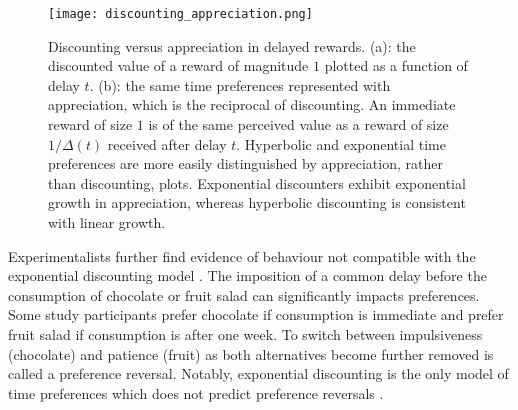\documentclass[titlepage, hidelinks, 12pt]{article}
\theoremstyle{plain}
\theoremstyle{remark}
\theoremstyle{definition}
\begin{document}
\begin{figure}[H]
    \centering
    \texttt{[image: discounting\_appreciation.png]}
    \caption[Example discounting and corresponding appreciation schedules.]{Discounting versus appreciation in delayed rewards. 
        (a): the discounted value of a reward of magnitude $1$ plotted as a function of delay $t$.  
        (b): the same time preferences represented with appreciation, which is the reciprocal of discounting. An immediate reward of size $1$ is
        of the same perceived value as a reward of size $1/\Delta(t)$ received after delay $t$. 
        Hyperbolic and exponential time preferences are more easily distinguished by appreciation, rather than discounting, plots.
        Exponential discounters exhibit exponential
        growth in appreciation, whereas hyperbolic discounting is consistent with linear growth.}
        \label{fig:discounting_appreciation}
\end{figure}



Experimentalists further find evidence of behaviour not compatible with the exponential discounting model \cite{read98}. 
The imposition of a common delay before the consumption of chocolate or fruit salad can significantly impacts preferences. 
Some study participants prefer chocolate if consumption is immediate and prefer fruit salad if consumption is after one week. 
To switch between impulsiveness (chocolate) and patience
(fruit) as
both alternatives become further removed is called a preference reversal. 
Notably, exponential discounting is the only model of time preferences which does not predict preference reversals
\cite{strotz55}. 



%
%
\end{document}
